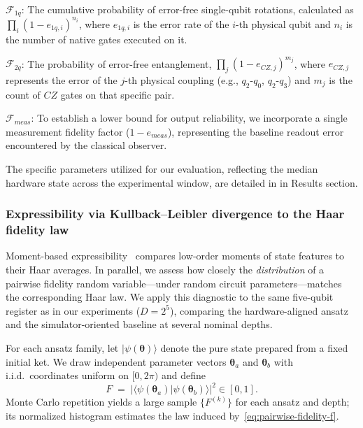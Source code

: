 \documentclass[11pt]{article}
\begin{document}
$\mathcal{F}_{1q}$: The cumulative probability of error-free single-qubit rotations, calculated as $\prod_{i} (1 - e_{1q, i})^{n_i}$, where $e_{1q, i}$ is the error rate of the $i$-th physical qubit and $n_i$ is the number of native gates executed on it.

$\mathcal{F}_{2q}$: The probability of error-free entanglement, $\prod_{j} (1 - e_{CZ, j})^{m_j}$, where $e_{CZ, j}$ represents the error of the $j$-th physical coupling (e.g., $q_2$-$q_0$, $q_2$-$q_3$) and $m_j$ is the count of $CZ$ gates on that specific pair.

$\mathcal{F}_{meas}$: To establish a lower bound for output reliability, we incorporate a single measurement fidelity factor ($1 - e_{meas}$), representing the baseline readout error encountered by the classical observer.

The specific parameters utilized for our evaluation, reflecting the median hardware state across the experimental window, are detailed in in Results section.




\subsubsection{Expressibility via Kullback--Leibler divergence to the Haar fidelity law}
Moment-based expressibility~\cite{sim2019} compares low-order moments of state features to their Haar averages. In parallel, we assess how closely the \emph{distribution} of a pairwise fidelity random variable---under random circuit parameters---matches the corresponding Haar law. We apply this diagnostic to the same five-qubit register as in our experiments ($D=2^{5}$), comparing the hardware-aligned ansatz and the simulator-oriented baseline at several nominal depths.

For each ansatz family, let $|\psi(\boldsymbol{\theta})\rangle$ denote the pure state prepared from a fixed initial ket. We draw independent parameter vectors $\boldsymbol{\theta}_{a}$ and $\boldsymbol{\theta}_{b}$ with i.i.d.\ coordinates uniform on $[0,2\pi)$ and define
\begin{equation}
\label{eq:pairwise-fidelity-f}
F \;=\; \bigl|\langle \psi(\boldsymbol{\theta}_{a}) | \psi(\boldsymbol{\theta}_{b}) \rangle \bigr|^{2} \in [0,1].
\end{equation}
Monte Carlo repetition yields a large sample $\{F^{(k)}\}$ for each ansatz and depth; its normalized histogram estimates the law induced by~\eqref{eq:pairwise-fidelity-f}.
\end{document}
